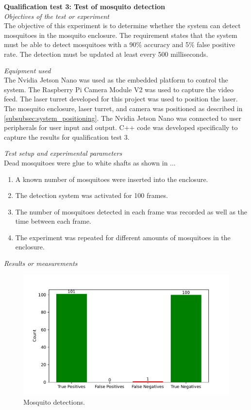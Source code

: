 \FloatBarrier
\textbf{Qualification test 3: Test of mosquito detection}\\
\textit{Objectives of the test or experiment}\\
The objective of this experiment is to determine whether the system can detect mosquitoes in the mosquito enclosure. The requirement states that the system must be able to detect mosquitoes with a 90\% accuracy and 5\% false positive rate. The detection must be updated at least every 500 milliseconds.

\textit{Equipment used}\\
The Nvidia Jetson Nano was used as the embedded platform to control the system. The Raspberry Pi Camera Module V2 was used to capture the video feed. The laser turret developed for this project was used to position the laser. The mosquito enclosure, laser turret, and camera was positioned as described in \autoref{subsubsec:system_positioning}. The Nvidia Jetson Nano was connected to user peripherals for user input and output. C++ code was developed specifically to capture the results for qualification test 3.

\textit{Test setup and experimental parameters}\\
Dead mosquitoes were glue to white shafts as shown in ...

\begin{enumerate}
  \item A known number of mosquitoes were inserted into the enclosure.
  \item The detection system was activated for 100 frames.
  \item The number of mosquitoes detected in each frame was recorded as well as the time between each frame.
  \item The experiment was repeated for different amounts of mosquitoes in the enclosure.
\end{enumerate}

\textit{Results or measurements}\\
\begin{figure}[h]
  \centering
  \includegraphics[width=\textwidth]{figures/results/detection.pdf}
  \caption{Mosquito detections.}
  \label{fig:detection}
\end{figure}

